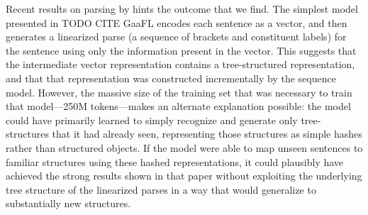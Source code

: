 Recent results on parsing by  hints the outcome that we find. The simplest model presented in TODO CITE GaaFL encodes each sentence as a vector, and then generates a linearized parse (a sequence of brackets and constituent labels) for the sentence using only the information present in the vector. This suggests that the intermediate vector representation contains a tree-structured representation, and that that representation was constructed incrementally by the sequence model. However, the massive size of the training set that was necessary to train that model---250M tokens---makes an alternate explanation possible: the model could have primarily learned to simply recognize and generate only tree-structures that it had already seen, representing those structures as simple hashes rather than structured objects. If the model were able to map unseen sentences to familiar structures using these hashed representations, it could plausibly have achieved the strong results shown in that paper without exploiting the underlying tree structure of the linearized parses in a way that would generalize to substantially new structures.
